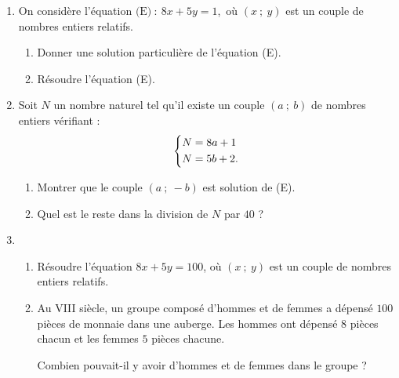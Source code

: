 \begin{colonne*exercice}
\columnbreak

\begin{exercice}
\begin{enumerate}
\item On considère l'équation $\text{(E)}~:~8x + 5y = 1$,~où $(x~;~y)$ est un couple de nombres entiers relatifs. 
\begin{enumerate}
\item Donner une solution particulière de l'équation (E). 
\item Résoudre l'équation (E). 
\end{enumerate} 

\item Soit $N$ un nombre naturel tel qu'il existe un couple $(a~;~b)$ de 
nombres entiers vérifiant :\vspace{-5pt} 
$$\left\{\begin{aligned} 
N&=8a + 1\\ 
N&=5b + 2.\\ 
\end{aligned}\right.\vspace{-5pt}$$ 

\begin{enumerate} 
\item Montrer que le couple $(a~;~-b)$ est solution de (E). 
\item Quel est le reste dans la division de $N$ par $40$ ? 
\end{enumerate} 

\item \begin{enumerate}
\item Résoudre l'équation $8x + 5 y = 100$, où $(x~;~ y)$ est un couple de  nombres entiers relatifs. 

\item Au VIII\ieme{} siècle, un groupe composé d'hommes et de femmes a  dépensé $100$ pièces de monnaie dans une auberge. Les hommes ont dépensé $8$ pièces 
chacun et les femmes $5$ pièces chacune. 

Combien pouvait-il y avoir d'hommes et de femmes dans le groupe ? 
\end{enumerate} 
\end{enumerate}
\end{exercice}





\end{colonne*exercice}
